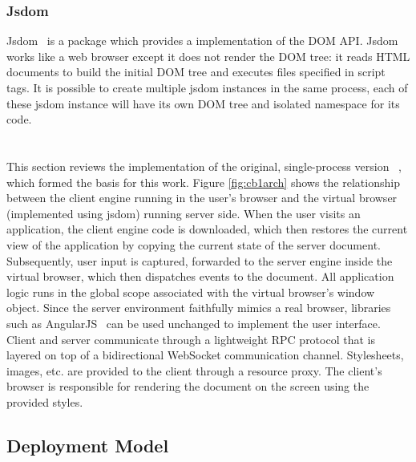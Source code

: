 \subsubsection{Jsdom}


Jsdom~\cite{JSDOM} is a \nodejs package which provides a \js implementation of the
DOM API. %
Jsdom works like a web browser except it does not render the DOM tree:
it reads HTML documents to build the initial DOM tree and executes \js files specified in script tags.
It is possible to create multiple jsdom instances in the same process,
each of these jsdom instance will have its own DOM tree and
isolated namespace for its \js code.


\section{\cb}

\architectureoverview{}

This section reviews the implementation of
the original, single-process version \cb{}~\cite{mcdaniel2012cloudbrowser},
which formed the basis for this work.
Figure \ref{fig:cb1arch} shows the relationship
between the client engine running in the user's browser and the virtual browser 
(implemented using jsdom)
running server side.  When the user visits an application, the client engine
code is downloaded, which then restores the current view of the application by
copying the current state of the server document.  Subsequently, user input
is captured, forwarded to the server engine inside the virtual browser,
which then dispatches events to the document.  All application logic runs
in the global scope associated with the virtual browser's window object.
Since the server environment faithfully mimics a real browser, libraries
such as AngularJS~\cite{hevery2009angular} can be used unchanged to implement 
the user interface.
Client and server communicate through a lightweight RPC protocol that is
layered on top of a bidirectional WebSocket communication channel.
Stylesheets, images, etc. are provided to the client through a resource
proxy.  The client's browser is responsible for rendering the document
on the screen using the provided styles.


\subsection{Deployment Model}
\label{sec:deploymodel}

\appbundlefig{}

